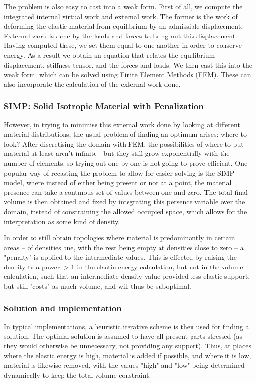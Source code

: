 The problem is also easy to cast into a weak form. First of all, we compute the integrated internal virtual work and external work. The former is the work of deforming the elastic material from equilibrium by an admissible displacement. External work is done by the loads and forces to bring out this displacement. Having computed these, we set them equal to one another in order to conserve energy. As a result we obtain an equation that relates the equilibrium displacement, stiffness tensor, and the forces and loads. We then cast this into the weak form, which can be solved using Finite Element Methods (FEM). These can also incorporate the calculation of the external work done.

\subsubsection{SIMP: Solid Isotropic Material with Penalization}
However, in trying to minimise this external work done by looking at different material distributions, the usual problem of finding an optimum arises: where to look? After discretising the domain with FEM, the possibilities of where to put material at least aren't infinite - but they still grow exponentially with the number of elements, so trying out one-by-one is not going to prove efficient. One popular way of recasting the problem to allow for easier solving is the SIMP model, where instead of either being present or not at a point, the material presence can take a continous set of values between one and zero. The total final volume is then obtained and fixed by integrating this persence variable over the domain, instead of constraining the allowed occupied space, which allows for the interpretation as some kind of density.

In order to still obtain topologies where material is predominantly in certain areas -- of densities one, with the rest being empty at densities close to zero -- a "penalty" is applied to the intermediate values. This is effected by raising the density to a power $> 1$ in the elastic energy calculation, but not in the volume calculation, such that an intermediate density value provided less elastic support, but still "costs" as much volume, and will thus be suboptimal. 

\subsubsection{Solution and implementation}
In typical implementations, a heuristic iterative scheme is then used for finding a solution. The optimal solution is assumed to have all present parts stressed (as they would otherwise be unnecessary, not providing any support). Thus, at places where the elastic energy is high, material is added if possible, and where it is low, material is likewise removed, with the values "high" and "low" being determined dynamically to keep the total volume constraint. 

